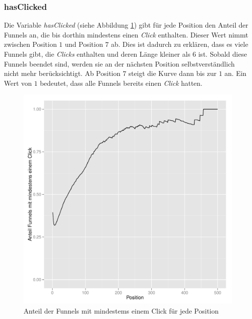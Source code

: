\subsubsection*{hasClicked}
Die Variable \textit{hasClicked} (siehe Abbildung \ref{hasClicked}) gibt für jede Position den Anteil der Funnels an, die bis dorthin mindestens einen \textit{Click} enthalten. Dieser Wert nimmt zwischen Position $1$ und Position $7$ ab. Dies ist dadurch zu erklären, dass es viele Funnels gibt, die \textit{Clicks} enthalten und deren Länge kleiner als $6$ ist. Sobald diese Funnels beendet sind, werden sie an der nächsten Position selbstverständlich nicht mehr berücksichtigt. Ab Position $7$ steigt die Kurve dann bis zur $1$ an. Ein Wert von $1$ bedeutet, dass alle Funnels bereits einen \textit{Click} hatten.
\begin{figure}[H]
    \centering
    \includegraphics[scale=0.3]{hasClickedSucc.pdf}
    \caption[Anteil Funnels mit mindestens einem Click]{Anteil der Funnels mit mindestems einem Click für jede Position}
    \label{hasClicked}
\end{figure}

